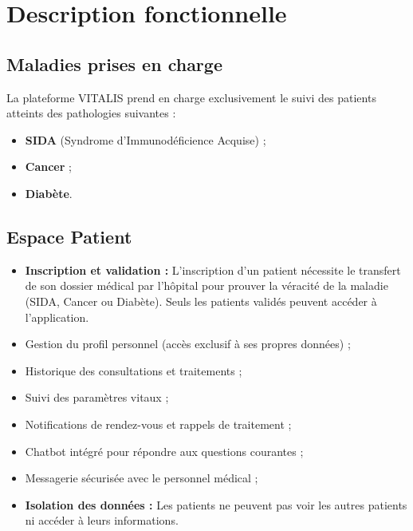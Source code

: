 ﻿\documentclass[12pt,a4paper]{report}
\begin{document}
\newpage  
\section*{Description fonctionnelle}  

\subsection*{Maladies prises en charge}  
La plateforme VITALIS prend en charge exclusivement le suivi des patients atteints des pathologies suivantes :
\begin{itemize}
    \item \textbf{SIDA} (Syndrome d'Immunodéficience Acquise) ;
    \item \textbf{Cancer} ;
    \item \textbf{Diabète}.
\end{itemize}

\subsection*{Espace Patient}  
\begin{itemize}
    \item \textbf{Inscription et validation :} L'inscription d'un patient nécessite le transfert de son dossier médical par l'hôpital pour prouver la véracité de la maladie (SIDA, Cancer ou Diabète). Seuls les patients validés peuvent accéder à l'application.
    \item Gestion du profil personnel (accès exclusif à ses propres données) ;
    \item Historique des consultations et traitements ;
    \item Suivi des paramètres vitaux ;
    \item Notifications de rendez-vous et rappels de traitement ;
    \item Chatbot intégré pour répondre aux questions courantes ;
    \item Messagerie sécurisée avec le personnel médical ;
    \item \textbf{Isolation des données :} Les patients ne peuvent pas voir les autres patients ni accéder à leurs informations.
\end{itemize}
\end{document}
